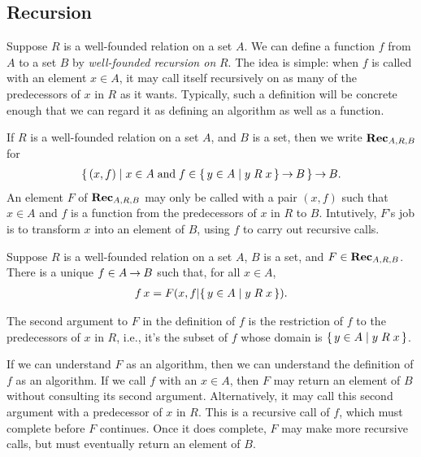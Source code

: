 %

\subsection{Recursion}

%
Suppose $R$ is a well-founded relation on a set $A$.  We can define a
function $f$ from $A$ to a set $B$ by \emph{well-founded recursion on}
$R$.  The idea is simple: when $f$ is called with an element $x\in A$,
it may call itself recursively on as many of the predecessors of $x$ in
$R$ as it wants.  Typically, such a definition will be concrete enough
that we can regard it as defining an algorithm as well as a function.

If $R$ is a well-founded relation on a set $A$, and $B$ is a set,
then we write $\mathbf{Rec}_{A,R,B}$ for
\begin{gather*}
\{ \, (x,f) \mid x\in A\;\allowbreak\mbox{and}\allowbreak\;f\in\{ \, y\in A \mid y\mathrel{R}x \, \}\mathbin{\to} B \, \}
\mathbin{\to} B .
\end{gather*}
An element $F$ of $\mathbf{Rec}_{A,R,B}$ may only be called with a pair
$(x,f)$ such that $x\in A$ and $f$ is a function from the predecessors
of $x$ in $R$ to $B$.  Intutively, $F$'s job is to transform $x$
into an element of $B$, using $f$ to carry out recursive calls.

\begin{theorem}
\label{WellFoundedRecursion}
Suppose $R$ is a well-founded relation on a set $A$, $B$ is
a set, and $F\in\mathbf{Rec}_{A,R,B}$.  There is a unique $f\in A\mathbin{\to} B$
such that, for all $x\in A$,
\begin{gather*}
f\,x = F(x, f\mathord{\mid}\{ \, y\in A \mid y\mathrel{R}x \, \}) .
\end{gather*}
\end{theorem}
 
The second argument to $F$ in the definition of $f$ is the restriction
of $f$ to the predecessors of $x$ in $R$, i.e., it's the subset of
$f$ whose domain is $\{ \, y\in A \mid y\mathrel{R}x \, \}$.

If we can understand $F$ as an algorithm, then we can understand the
definition of $f$ as an algorithm.  If we call $f$ with an $x\in A$,
then $F$ may return an element of $B$ without consulting its second
argument.  Alternatively, it may call this second argument with a
predecessor of $x$ in $R$.  This is a recursive call of $f$, which must
complete before $F$ continues.  Once it does complete, $F$ may make
more recursive calls, but must eventually return an element of $B$.

